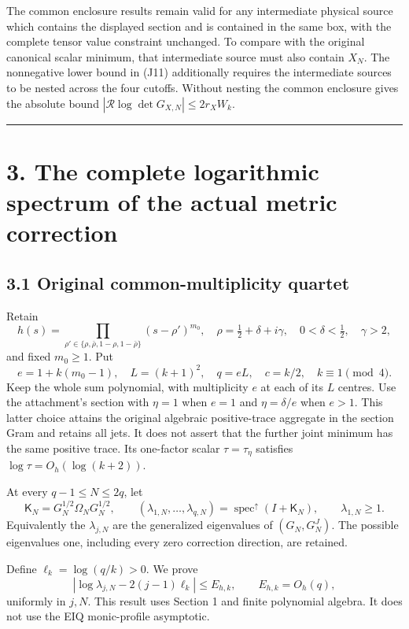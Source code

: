 The common enclosure results remain valid for any intermediate physical source which contains the displayed section and is contained in the same box, with the complete tensor value constraint unchanged. To compare with the original canonical scalar minimum, that intermediate source must also contain \(X_N\). The nonnegative lower bound in (J11) additionally requires the intermediate sources to be nested across the four cutoffs. Without nesting the common enclosure gives the absolute bound \(|\mathcal R\log\det G_{X,N}|\le 2r_XW_k\).

\begin{center}\rule{0.5\linewidth}{0.5pt}\end{center}

\section{3. The complete logarithmic spectrum of the actual metric correction}\label{the-complete-logarithmic-spectrum-of-the-actual-metric-correction}

\subsection{3.1 Original common-multiplicity quartet}\label{original-common-multiplicity-quartet}

Retain \[
h(s)=\prod_{\rho'\in\{\rho,\bar\rho,1-\rho,1-\bar\rho\}}
(s-\rho')^{m_0},\quad
\rho=\tfrac12+\delta+i\gamma,\quad0<\delta<\tfrac12,\quad\gamma>2,
\] and fixed \(m_0\ge1\). Put \[
e=1+k(m_0-1),\quad L=(k+1)^2,\quad q=eL,\quad c=k/2,\quad
k\equiv1\pmod4.
\] Keep the whole sum polynomial, with multiplicity \(e\) at each of its \(L\) centres. Use the attachment's section with \(\eta=1\) when \(e=1\) and \(\eta=\delta/e\) when \(e>1\). This latter choice attains the original algebraic positive-trace aggregate in the section Gram and retains all jets. It does not assert that the further joint minimum has the same positive trace. Its one-factor scalar \(\tau=\tau_\eta\) satisfies \(\log\tau=O_h(\log(k+2))\).

At every \(q-1\le N\le2q\), let \[
 \mathsf K_N=G_N^{1/2}\Omega_NG_N^{1/2},
 \qquad
 (\lambda_{1,N},\ldots,\lambda_{q,N})
 =\operatorname{spec}^{\uparrow}(I+\mathsf K_N),\qquad \lambda_{1,N}\ge1.
\] Equivalently the \(\lambda_{j,N}\) are the generalized eigenvalues of \((G_N,G_N^J)\). The possible eigenvalues one, including every zero correction direction, are retained.

Define \(\ell_k=\log(q/k)>0\). We prove \[
 \boxed{
 \left|\log\lambda_{j,N}-2(j-1)\ell_k\right|
 \le E_{h,k},\qquad E_{h,k}=O_h(q),
 } \tag{S1}
\] uniformly in \(j,N\). This result uses Section 1 and finite polynomial algebra. It does not use the EIQ monic-profile asymptotic.

